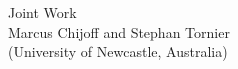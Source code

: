 \documentclass[preview]{standalone}
\begin{document}
\begin{center}
Joint Work \\ Marcus Chijoff and Stephan Tornier \\ (University of Newcastle, Australia)
\end{center}
\end{document}
